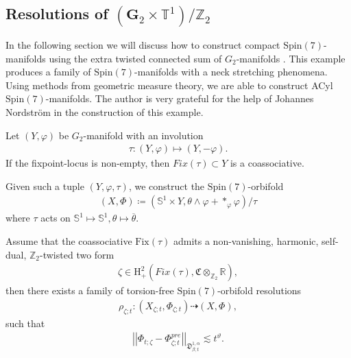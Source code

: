 \documentclass[psamsfonts]{amsart}
\theoremstyle{plain}
\theoremstyle{definition}{
\newtheorem{defi}{Definition}[section]
\newtheorem{ass}{Assumption}
\newtheorem*{nota}{Notation}}
\theoremstyle{remark}{
\newtheorem{rem}{Remark}
\newtheorem{ex}{Example}}
\theoremstyle{plain}{
\newtheorem{thm}{Theorem}[section]
\newtheorem{lem}{Lemma}[section]
\newtheorem{cor}{Corollary}[section]
\newtheorem{prop}{Proposition}[section]
\newtheorem{con}{Conjecture}[section]}
\newcommand{\m}[1]{{\mathrm{#1}}}
\newcommand{\cat}[1]{\textbf{#1}}
\begin{document}
\subsection{Resolutions of $(\cat{G}_2\times\mathbb{T}^1)/\mathbb{Z}_2$}
\label{Resolutions of G2T1}

In the following section we will discuss how to construct compact $\m{Spin}(7)$-manifolds using the extra twisted connected sum of $G_2$-manifolds \cite{nordstrom2023extra}. This example produces a family of $\m{Spin}(7)$-manifolds with a neck stretching phenomena. Using methods from geometric measure theory, we are able to construct ACyl $\m{Spin}(7)$-manifolds. The author is very grateful for the help of Johannes Nordström in the construction of this example. 

\begin{lem}\cite[Prop. 10.8.1]{joyce2000compact}
    Let $(Y,\varphi)$ be $G_2$-manifold with an involution 
    \begin{align*}
        \tau\colon (Y,\varphi)\mapsto (Y,-\varphi).
    \end{align*}
    If the fixpoint-locus is non-empty, then $Fix(\tau)\subset Y$ is a coassociative. 
\end{lem}

Given such a tuple $(Y,\varphi,\tau)$, we construct the $\m{Spin}(7)$-orbifold 
\begin{align*}
    (X,\Phi)\coloneqq(\mathbb{S}^1\times Y,\theta\wedge\varphi+*_{\varphi}\varphi)/\tau
\end{align*}
where $\tau$ acts on $\mathbb{S}^1\mapsto \mathbb{S}^1,\theta\mapsto \overline{\theta}$. 

\begin{lem}
    Assume that the coassociative $\m{Fix}(\tau)$ admits a non-vanishing, harmonic, self-dual, $\mathbb{Z}_2$-twisted two form 
    \begin{align*}
        \zeta\in \m{H}^2_+(Fix(\tau),\mathfrak{C}\otimes_{\mathbb{Z}_2}\mathbb{R}),
    \end{align*}
    then there exists a family of torsion-free $\m{Spin}(7)$-orbifold resolutions
    \begin{align*}
        \rho_{\zeta;t}\colon (X_{\zeta;t},\Phi_{\zeta;t})\dashrightarrow (X,\Phi),
    \end{align*}
    such that 
    \begin{align*}
        \left|\left|\Phi_{t;\zeta}-\Phi^{pre}_{\zeta;t}\right|\right|_{\mathfrak{D}^{1,\alpha}_{\beta;t}}\lesssim t^\vartheta.
    \end{align*}
\end{lem}
\end{document}
